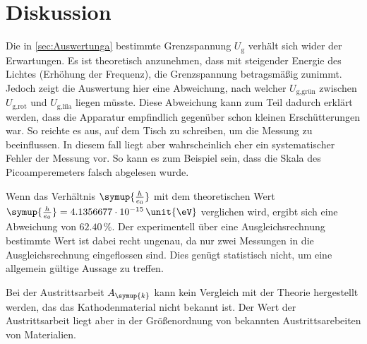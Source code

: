 \section{Diskussion}
\label{sec:Diskussion}

Die in \autoref{sec:Auswertunga} bestimmte Grenzspannung $U_{\text{g}}$ verhält sich wider der Erwartungen. Es ist theoretisch anzunehmen, dass mit steigender Energie des Lichtes (Erhöhung der Frequenz), die Grenzspannung betragsmäßig 
zunimmt. Jedoch zeigt die Auswertung hier eine Abweichung, nach welcher $U_{\text{g,grün}}$ zwischen $U_{\text{g,rot}}$ und $U_{\text{g,lila}}$ liegen müsste. 
Diese Abweichung kann zum Teil dadurch erklärt werden, dass die Apparatur empfindlich gegenüber schon kleinen Erschütterungen war. So reichte es aus, auf dem Tisch zu schreiben, um die Messung zu beeinflussen.
In diesem fall liegt aber wahrscheinlich eher ein systematischer Fehler der Messung vor. So kann es zum Beispiel sein, dass die Skala des Picoamperemeters 
falsch abgelesen wurde.

Wenn das Verhältnis $\symup{\frac{h}{e_0}}$ mit dem theoretischen Wert $\symup{\frac{h}{e_0}} = 4.1356677 \cdot 10^{-15} \,\unit{\eV}$ verglichen wird, 
ergibt sich eine Abweichung von $62.40\,\%$. Der experimentell über eine Ausgleichsrechnung bestimmte Wert ist dabei recht ungenau, da nur zwei Messungen 
in die Ausgleichsrechnung eingeflossen sind. Dies genügt statistisch nicht, um eine allgemein gültige Aussage zu treffen. 

Bei der Austrittsarbeit $A_{\symup{k}}$ kann kein Vergleich mit der Theorie hergestellt werden, das das Kathodenmaterial nicht bekannt ist. Der Wert der 
Austrittsarbeit liegt aber in der Größenordnung von bekannten Austrittsarebeiten von Materialien. 

